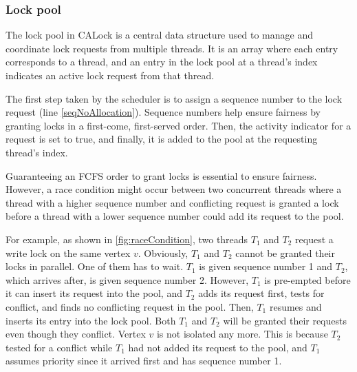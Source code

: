 \subsubsection{Lock pool}
The lock pool in CALock is a central data structure used to manage and coordinate lock requests from multiple threads. It is an array where each entry corresponds to a thread, and an entry in the lock pool at a thread's index indicates an active lock request from that thread.

The first step taken by the scheduler is to assign a sequence number to the lock request (line \ref{seqNoAllocation}). Sequence numbers help ensure fairness by granting locks in a first-come, first-served order. Then, the activity indicator for a request is set to true, and finally, it is added to the pool at the requesting thread's index. 


Guaranteeing an FCFS order to grant locks is essential to ensure fairness. However, a race condition might occur between two concurrent threads where a thread with a higher sequence number and conflicting request is granted a lock before a thread with a lower sequence number could add its request to the pool. 

For example, as shown in \cref{fig:raceCondition}, two threads $T_1$ and $T_2$ request a write lock on the same vertex $v$. Obviously, $T_1$ and $T_2$ cannot be granted their locks in parallel. One of them has to wait. $T_1$ is given sequence number 1 and $T_2$, which arrives after, is given sequence number 2. However, $T_1$ is pre-empted before it can insert its request into the pool, and $T_2$ adds its request first, tests for conflict, and finds no conflicting request in the pool. Then, $T_1$ resumes and inserts its entry into the lock pool. 
Both $T_1$ and $T_2$ will be granted their requests even though they conflict. Vertex $v$ is not isolated any more. This is because $T_2$ tested for a conflict while $T_1$ had not added its request to the pool, and $T_1$ assumes priority since it arrived first and has sequence number 1.

